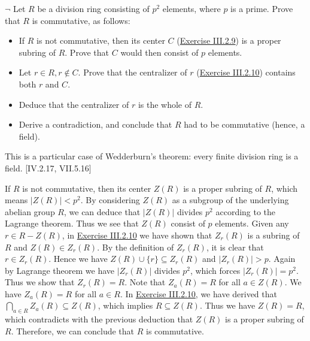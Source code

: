 \documentclass[12pt,letterpaper,boxed]{hmcpset}
\begin{document}
\hypertarget{Exercise III.2.11}{}
\begin{problem}[2.11]
$\neg$ Let $R$ be a division ring consisting of $p^{2}$ elements, where $p$ is a prime. Prove that $R$ is commutative, as follows:
\begin{itemize}
	\item If $R$ is not commutative, then its center $C$ (\hyperlink{Exercise III.2.9}{Exercise III.2.9}) is a proper subring of $R .$ Prove that $C$ would then consist of $p$ elements.
	\item Let $r \in R, r \notin C .$ Prove that the centralizer of $r$ (\hyperlink{Exercise III.2.10}{Exercise III.2.10}) contains both $r$ and $C$.
	\item Deduce that the centralizer of $r$ is the whole of $R$.
	\item Derive a contradiction, and conclude that $R$ had to be commutative (hence, a field).
\end{itemize}
This is a particular case of Wedderburn's theorem: every finite division ring is a field. [IV.2.17, VII.5.16]
\end{problem}
\begin{solution}
	If $R$ is not commutative, then its center $Z(R)$ is a proper subring of $R$, which means $|Z(R)|<p^2$. By considering $Z(R)$ as a subgroup of the underlying abelian group $R$, we can deduce that $|Z(R)|$ divides $p^2$ according to the Lagrange theorem. Thus we see that $Z(R)$ consist of $p$ elements. Given any $r \in R-Z(R)$, in \hyperlink{Exercise III.2.10}{Exercise III.2.10} we have shown that $Z_r(R)$ is a subring of $R$ and $Z(R)\in Z_r(R)$. By the definition of $Z_r(R)$, it is clear that $r\in Z_r(R)$. Hence we have $Z(R)\cup \{r\}\subseteq Z_r(R)$ and $|Z_r(R)|>p$. Again by Lagrange theorem we have $|Z_r(R)|$ divides $p^2$, which forces $|Z_r(R)|=p^2$. Thus we show that $Z_r(R)=R$. Note that $Z_a(R)=R$ for all $a\in Z(R)$. We have $Z_a(R)=R$ for all $a\in R$. In \hyperlink{Exercise III.2.10}{Exercise III.2.10}, we have derived that $\bigcap_{a\in R} Z_a(R)\subseteq Z(R)$, which implies $R\subseteq Z(R)$. Thus we have $Z(R)=R$, which contradicts with the previous deduction that $Z(R)$ is a proper subring of $R$.  Therefore, we can conclude that $R$ is commutative.
\end{solution}
\end{document}
